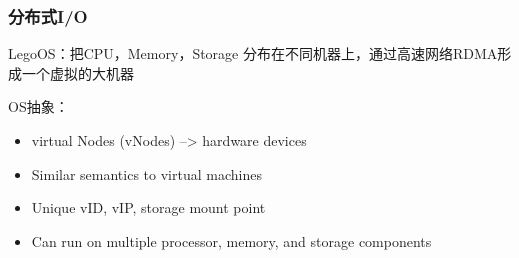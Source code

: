 \begin{frame}[fragile]
    \frametitle{分布式I/O}
    LegoOS：把CPU，Memory，Storage 分布在不同机器上，通过高速网络RDMA形成一个虚拟的大机器
    
    OS抽象：
    \begin{itemize}
        \item virtual Nodes (vNodes)  --> hardware devices
        \item Similar semantics to virtual machines
        \item Unique vID, vIP, storage mount point
        \item  Can run on multiple processor, memory, and storage components    
    \end{itemize}
    
\end{frame}

